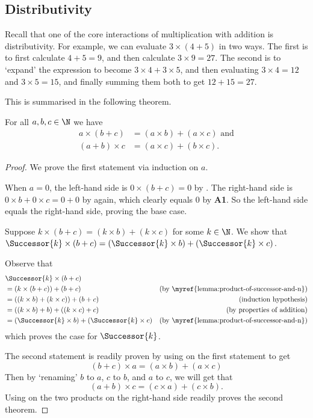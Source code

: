 \subsection{Distributivity}
Recall that one of the core interactions of multiplication with addition is distributivity. For example, we can evaluate $3 \times (4 + 5)$ in two ways. The first is to first calculate $4 + 5 = 9$, and then calculate $3 \times 9 = 27$. The second is to `expand' the expression to become $3 \times 4 + 3 \times 5$, and then evaluating $3 \times 4 = 12$ and $3 \times 5 = 15$, and finally summing them both to get $12 + 15 = 27$.

This is summarised in the following theorem.

\begin{theorem}\label{theorem:multiplication-distributivity-naturals}
    For all $a, b, c \in \N$ we have
    \begin{align*}
        a\times(b+c) &= (a\times b) + (a\times c) \text{ and}\\
        (a+b)\times c &= (a\times c) + (b\times c).
    \end{align*}
\end{theorem}
\begin{proof}
    We prove the first statement via induction on $a$.

    When $a = 0$, the left-hand side is $0\times(b+c) = 0$ by . The right-hand side is $0\times b + 0\times c = 0 + 0$ by  again, which clearly equals 0 by \textbf{A1}. So the left-hand side equals the right-hand side, proving the base case.

    Suppose $k\times(b+c) = (k\times b) + (k\times c)$ for some $k \in \N$. We show that $\Successor{k}\times(b+c) = (\Successor{k}\times b) + (\Successor{k} \times c)$.

    Observe that
    \begin{align*}
        &\Successor{k}\times(b+c)\\
        &= (k \times (b+c)) + (b+c) & (\text{by \myref{lemma:product-of-successor-and-n}})\\
        &= ((k\times b) + (k\times c)) + (b+c) & (\text{induction hypothesis})\\
        &= ((k\times b) + b) + ((k\times c) + c) & (\text{by properties of addition})\\
        &= (\Successor{k}\times b) + (\Successor{k} \times c) & (\text{by \myref{lemma:product-of-successor-and-n}})
    \end{align*}
    which proves the case for $\Successor{k}$.

    The second statement is readily proven by using  on the first statement to get
    \[
        (b+c)\times a = (a\times b) + (a\times c)
    \]
    Then by `renaming' $b$ to $a$, $c$ to $b$, and $a$ to $c$, we will get that
    \[
        (a+b)\times c = (c\times a) + (c\times b).
    \]
    Using  on the two products on the right-hand side readily proves the second theorem.
\end{proof}

